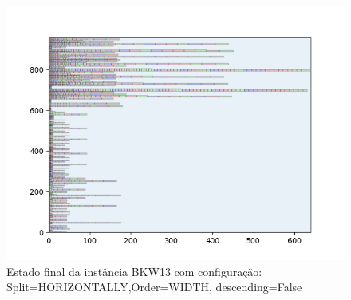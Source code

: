 \begin{figure}[H]
    \centering
    \caption[]{Estado final da instância BKW13 com configuração: Split=HORIZONTALLY,Order=WIDTH, descending=False}
    \label{fig:bkw13-horizontally-width-false}
    \includegraphics[scale=0.5]{output/figures/bkw/bkw13/horizontally/width/false/0000}
\end{figure}
